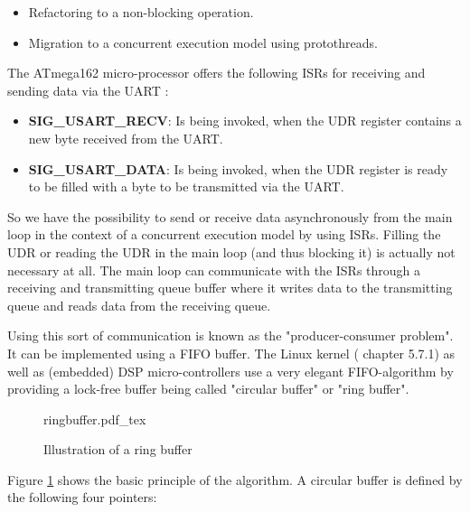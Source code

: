 \begin{itemize}
    \item Refactoring to a non-blocking operation.
    \item Migration to a concurrent execution model using protothreads.
\end{itemize}

The ATmega162 micro-processor offers the following ISRs for receiving and sending data via the UART \cite{atmega162datasheet}:

\begin{itemize}
    \item \textbf{SIG\_USART\_RECV}: Is being invoked, when the UDR register contains a new byte received from the UART.
    \item \textbf{SIG\_USART\_DATA}: Is being invoked, when the UDR register is ready to be filled with a byte to be transmitted via the UART.
\end{itemize}

So we have the possibility to send or receive data asynchronously from the main loop in the context of a concurrent execution model by using ISRs. Filling the UDR or reading the UDR in the main loop (and thus blocking it) is actually not necessary at all. The main loop can communicate with the ISRs through a receiving and transmitting queue buffer where it writes data to the transmitting queue and reads data from the receiving queue.

Using this sort of communication is known as the "producer-consumer problem". It can be implemented using a FIFO buffer. The Linux kernel (\cite{linux_device_drivers} chapter 5.7.1) as well as (embedded) DSP micro-controllers \cite{ti_dsp} use a very elegant FIFO-algorithm by providing a lock-free buffer being called "circular buffer" or "ring buffer".

\begin{figure}[H]
\centering
{ringbuffer.pdf_tex}
\caption{Illustration of a ring buffer}
\label{fig:ringbuffer}
\end{figure}

Figure \ref{fig:ringbuffer} shows the basic principle of the algorithm. A circular buffer is defined by the following four pointers:

